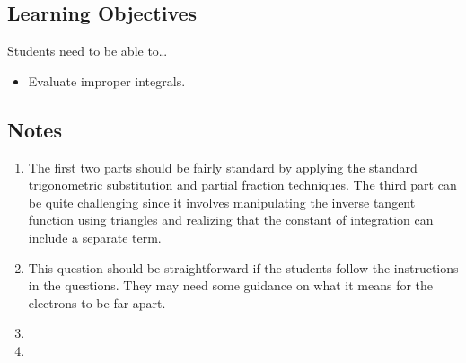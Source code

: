 \subsection*{Learning Objectives}
Students need to be able to\ldots
\begin{itemize}
	\item Evaluate improper integrals.
\end{itemize}

\subsection*{Notes}
	\begin{enumerate}
			\item The first two parts should be fairly standard by applying the standard trigonometric substitution and partial fraction techniques. The third part can be quite challenging since it involves manipulating the inverse tangent function using triangles and realizing that the constant of integration can include a separate term.

            \item This question should be straightforward if the students follow the instructions in the questions. They may need some guidance on what it means for the electrons to be far apart.

            \item 

            \item 
	\end{enumerate}